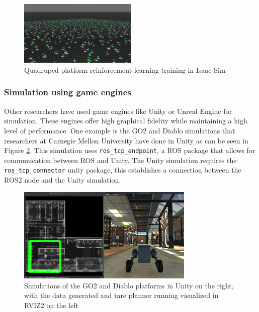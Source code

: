 \documentclass[12pt]{article}
\begin{document}
            \begin{figure}[H]
                \centering
                \includegraphics[width=0.5\textwidth]{Images/go2_rl_training.png}
                \caption{Quadruped platform reinforcement learning training in Isaac Sim}
                \label{fig:isaac_sim_quadruped}
            \end{figure}

        \subsubsection{Simulation using game engines}

            Other researchers have used game engines like Unity or Unreal Engine for simulation. These engines offer high graphical fidelity while maintaining a high level of performance. One example is the GO2 and Diablo simulations that researchers at Carnegie Mellon University have done in Unity as can be seen in Figure \ref{fig:unity_simulation}. This simulation uses \texttt{ros\_tcp\_endpoint}, a ROS package that allows for communication between ROS and Unity. The Unity simulation requires the \texttt{ros\_tcp\_connector} unity package, this establishes a connection between the ROS2 node and the Unity simulation.
            \begin{figure}[h]
                \centering
                \includegraphics[width=0.75\textwidth]{Images/Unity_simulation.png}
                \caption{Simulations of the GO2 and Diablo platforms in Unity on the right, with the data generated and tare planner running visualized in RVIZ2 on the left}
                \label{fig:unity_simulation}
            \end{figure}
\end{document}

